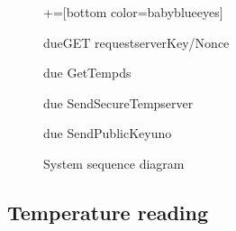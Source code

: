 \begin{figure}[H]
\begin {sequencediagram}

	+=[bottom color=babyblueeyes]
	
	\begin {call}{due}{GET request}{server}{Key/Nonce}
	\end {call}
	\begin {call}{due}{ GetTemp}{ds}{}
	\end {call}
	\begin {call}{due}{ SendSecureTemp}{server}{}
	\end {call}
	\begin {call}{due}{ SendPublicKey}{uno}{}
	
	\end {call}
\end {sequencediagram}
  \caption{System sequence diagram}
  \label{fig:messeq}
\end{figure}

\subsection{Temperature reading}

